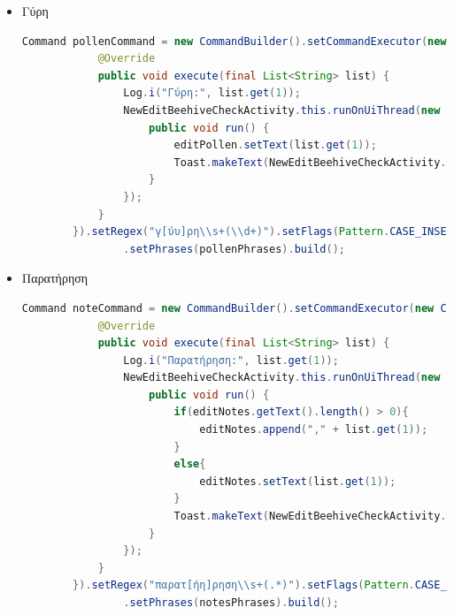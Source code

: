 \documentclass[oneside, 12pt]{book}
\begin{document}
\begin{itemize}
\begin{lstlisting}[language=java]
                    }
                });
            }
        }).setRegex("μ[έε]λι\\s+(\\d+)").setFlags(Pattern.CASE_INSENSITIVE | Pattern.DOTALL)
                .setPhrases(honeyPhrases).build();
	\end{lstlisting}
	\item Γύρη
	\begin{lstlisting}[language=java]
	 Command pollenCommand = new CommandBuilder().setCommandExecutor(new CommandExecutor() {
            @Override
            public void execute(final List<String> list) {
                Log.i("Γύρη:", list.get(1));
                NewEditBeehiveCheckActivity.this.runOnUiThread(new Runnable() {
                    public void run() {
                        editPollen.setText(list.get(1));
                        Toast.makeText(NewEditBeehiveCheckActivity.this, "Γύρη " + list.get(1) + "!", Toast.LENGTH_LONG).show();
                    }
                });
            }
        }).setRegex("γ[ύυ]ρη\\s+(\\d+)").setFlags(Pattern.CASE_INSENSITIVE | Pattern.DOTALL)
                .setPhrases(pollenPhrases).build();
	\end{lstlisting}
	\item Παρατήρηση
	\begin{lstlisting}[language=java]
	 Command noteCommand = new CommandBuilder().setCommandExecutor(new CommandExecutor() {
            @Override
            public void execute(final List<String> list) {
                Log.i("Παρατήρηση:", list.get(1));
                NewEditBeehiveCheckActivity.this.runOnUiThread(new Runnable() {
                    public void run() {
                        if(editNotes.getText().length() > 0){
                            editNotes.append("," + list.get(1));
                        }
                        else{
                            editNotes.setText(list.get(1));
                        }
                        Toast.makeText(NewEditBeehiveCheckActivity.this, "Παρατήρηση " + list.get(1) + "!", Toast.LENGTH_LONG).show();
                    }
                });
            }
        }).setRegex("παρατ[ήη]ρηση\\s+(.*)").setFlags(Pattern.CASE_INSENSITIVE | Pattern.DOTALL)
                .setPhrases(notesPhrases).build();
	\end{lstlisting}
\end{itemize}
\end{document}
